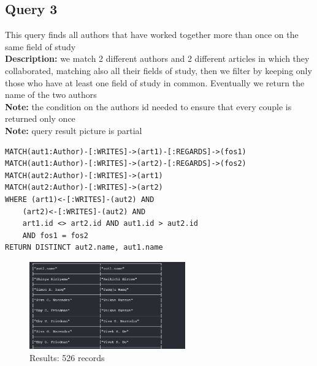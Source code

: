\documentclass{Configuration_Files/PoliMi3i_thesis}
\begin{document}
\subsection{Query 3}
This query finds all authors that have worked together more than once on the same field of study\\
\textbf{Description:} we match 2 different authors and 2 different articles in which they collaborated,
matching also all their fields of study, then we filter by keeping only those who have at least one field of study in common.
Eventually we return the name of the two authors\\
\textbf{Note:} the condition on the authors id needed to ensure that every couple is returned only once\\
\textbf{Note:} query result picture is partial
\begin{lstlisting}[language=cypher, label=lst:cypher-example]
MATCH(aut1:Author)-[:WRITES]->(art1)-[:REGARDS]->(fos1)
MATCH(aut1:Author)-[:WRITES]->(art2)-[:REGARDS]->(fos2)
MATCH(aut2:Author)-[:WRITES]->(art1)
MATCH(aut2:Author)-[:WRITES]->(art2)
WHERE (art1)<-[:WRITES]-(aut2) AND
    (art2)<-[:WRITES]-(aut2) AND
    art1.id <> art2.id AND aut1.id > aut2.id
    AND fos1 = fos2
RETURN DISTINCT aut2.name, aut1.name
\end{lstlisting}
\begin{figure}[H]
\centering
\includegraphics[width=0.6\textwidth]{query/query3.PNG}
\caption{Results: 526 records}
\label{fig:query3}
\end{figure}
\end{document}
